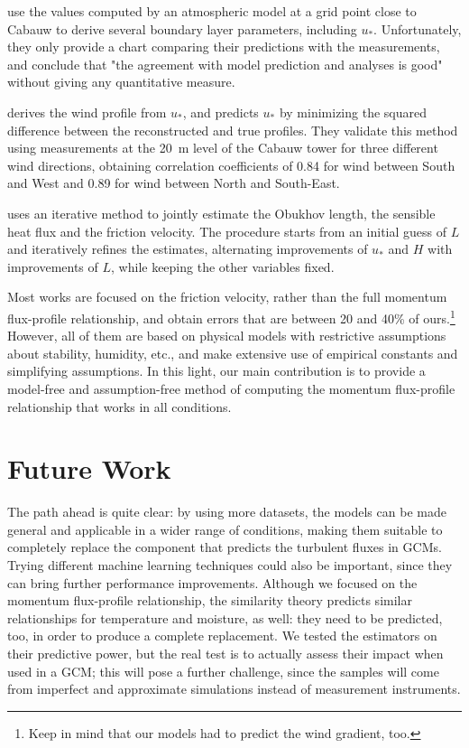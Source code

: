 \documentclass[a4paper,11pt]{kth-mag}
\begin{document}
\cite{predict_micro_from_macro_sim} use the values computed by an atmospheric model at a grid point close to Cabauw to derive several boundary layer parameters, including $u_*$. Unfortunately, they only provide a chart comparing their predictions with the measurements, and conclude that "the agreement with model prediction and analyses is good" without giving any quantitative measure.

\cite{ustar_from_profile} derives the wind profile from $u_*$, and predicts $u_*$ by minimizing the squared difference between the reconstructed and true profiles. They validate this method using measurements at the \SI{20}{\meter} level of the Cabauw tower for three different wind directions, obtaining correlation coefficients of 0.84 for wind between South and West and 0.89 for wind between North and South-East.

\cite{cabauw_abl} uses an iterative method to jointly estimate the Obukhov length, the sensible heat flux and the friction velocity. The procedure starts from an initial guess of $L$ and iteratively refines the estimates, alternating improvements of $u_*$ and $H$ with improvements of $L$, while keeping the other variables fixed.

Most works are focused on the friction velocity, rather than the full momentum flux-profile relationship, and obtain errors that are between 20 and 40\% of ours.\footnote{Keep in mind that our models had to predict the wind gradient, too.} However, all of them are based on physical models with restrictive assumptions about stability, humidity, etc., and make extensive use of empirical constants and simplifying assumptions. In this light, our main contribution is to provide a model-free and assumption-free method of computing the momentum flux-profile relationship that works in all conditions.


\section{Future Work}
\label{sec:future_work}
The path ahead is quite clear: by using more datasets, the models can be made general and applicable in a wider range of conditions, making them suitable to completely replace the component that predicts the turbulent fluxes in GCMs. Trying different machine learning techniques could also be important, since they can bring further performance improvements. Although we focused on the momentum flux-profile relationship, the similarity theory predicts similar relationships for temperature and moisture, as well: they need to be predicted, too, in order to produce a complete replacement. We tested the estimators on their predictive power, but the real test is to actually assess their impact when used in a GCM; this will pose a further challenge, since the samples will come from imperfect and approximate simulations instead of measurement instruments.
\end{document}
